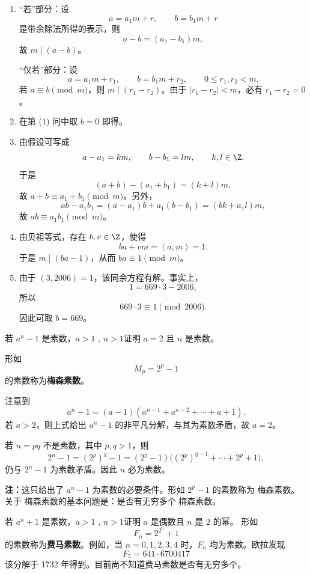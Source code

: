 \begin{solution}
	\begin{enumerate}
		\item “若”部分：设
		\[
		a=a_1m+r,
		\qquad b=b_1m+r
		\]
		是带余除法所得的表示，则
		\[
		a-b=(a_1-b_1)m,
		\]
		故 \(m\mid(a-b)\)。
		
		“仅若”部分：设
		\[
		a=a_1m+r_1,
		\qquad b=b_1m+r_2,
		\qquad 0\le r_1,r_2<m.
		\]
		若 \(a\equiv b\pmod m\)，则 \(m\mid(r_1-r_2)\)。由于 \(|r_1-r_2|<m\)，必有 \(r_1-r_2=0\)。
		
		\item 在第 (1) 问中取 \(b=0\) 即得。
		
		\item 由假设可写成
		\[
		a-a_1=km,
		\qquad b-b_1=lm,
		\qquad k,l\in\Z.
		\]
		于是
		\[
		(a+b)-(a_1+b_1)=(k+l)m,
		\]
		故 \(a+b\equiv a_1+b_1\pmod m\)。另外，
		\[
		ab-a_1b_1=(a-a_1)b+a_1(b-b_1)=(bk+a_1l)m,
		\]
		故 \(ab\equiv a_1b_1\pmod m\)。
		
		\item 由贝祖等式，存在 \(b,v\in\Z\)，使得
		\[
		ba+vm=(a,m)=1.
		\]
		于是 \(m\mid(ba-1)\)，从而 \(ba\equiv1\pmod m\)。
		
		\item 由于 \((3,2006)=1\)，该同余方程有解。事实上，
		\[
		1=669\cdot3-2006,
		\]
		所以
		\[
		669\cdot3\equiv1\pmod{2006}.
		\]
		因此可取 \(b=669\)。
	\end{enumerate}
\end{solution}

\begin{problem}
若 \(a^n-1\) 是素数，\(a>1\) , \(n>1\)证明 \(a=2\) 且 \(n\) 是素数。

\end{problem}
	形如
\[
M_p=2^p-1
\]
的素数称为\textbf{梅森素数}。
\begin{solution}
	
	
	注意到
	\[
	a^n-1=(a-1)(a^{n-1}+a^{n-2}+\cdots+a+1).
	\]
	若 \(a>2\)，则上式给出 \(a^n-1\) 的非平凡分解，与其为素数矛盾，故 \(a=2\)。
	
	若 \(n=pq\) 不是素数，其中 \(p,q>1\)，则
	\[
	2^n-1=(2^p)^q-1
	=(2^p-1)\bigl((2^p)^{q-1}+\cdots+2^p+1\bigr),
	\]
	仍与 \(2^n-1\) 为素数矛盾。因此 \(n\) 必为素数。
	
	
\end{solution}
\textbf{注：}这只给出了 \(a^n-1\) 为素数的必要条件。形如 \(2^p-1\) 的素数称为 梅森素数。关于 梅森素数的基本问题是：是否有无穷多个 梅森素数。
\begin{problem}
若 \(a^n+1\) 是素数，\(a>1\) , \(n>1\)证明 \(a\) 是偶数且 \(n\) 是 \(2\) 的幂。
	形如
	\[
	F_n=2^{2^n}+1
	\]
	的素数称为\textbf{费马素数}。例如，当 \(n=0,1,2,3,4\) 时，\(F_n\) 均为素数。欧拉发现
	\[
	F_5=641\cdot6700417
	\]
	该分解于 1732 年得到。目前尚不知道费马素数是否有无穷多个。
\end{problem}

